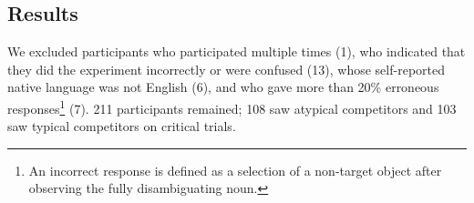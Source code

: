 \documentclass[10pt,letterpaper]{article}
\begin{document}



\subsection{Results}
We excluded participants who participated multiple times (1), who indicated that they did the experiment incorrectly or were confused (13), whose self-reported native language was not English (6), and who gave more than 20\% erroneous responses\footnote{An incorrect response is defined as a selection of a non-target object after observing the fully disambiguating noun.} (7).
211 participants remained; 108 saw atypical competitors and 103 saw typical competitors on critical trials. 
\end{document}
